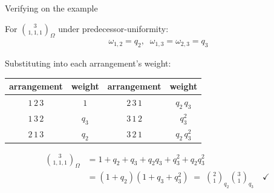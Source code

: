 \documentclass{beamer}
\renewcommand{\>}{\rangle}
\newcommand{\<}{\langle}
\begin{document}

\begin{frame}{Verifying on the example}

For $\binom{3}{1,1,1}_\Omega$ under predecessor-uniformity:
\begin{align*}
    \;\omega_{1,2} = q_2, \;\;\omega_{1,3} = \omega_{2,3} = q_3
\end{align*}

\medskip
Substituting into each arrangement's weight:

\smallskip
\begin{center}
\begin{tabular}{c@{\;\;}c@{\qquad\qquad}c@{\;\;}c}
\toprule
arrangement & weight & arrangement & weight \\
\midrule
$1\,2\,3$ & $1$    & $2\,3\,1$ & $q_2\,q_3$    \\
$1\,3\,2$ & $q_3$  & $3\,1\,2$ & $q_3^2$       \\
$2\,1\,3$ & $q_2$  & $3\,2\,1$ & $q_2\,q_3^2$  \\
\bottomrule
\end{tabular}
\end{center}

\medskip
\begin{align*}
\binom{3}{1,1,1}_\Omega 
&= 1 + q_2 + q_3 + q_2 q_3 + q_3^2 + q_2 q_3^2 \\
&= (1 + q_2)(1 + q_3 + q_3^2) 
\;=\; \binom{2}{1}_{q_2}\binom{3}{1}_{q_3} \quad\checkmark
\end{align*}

\end{frame}
\end{document}
